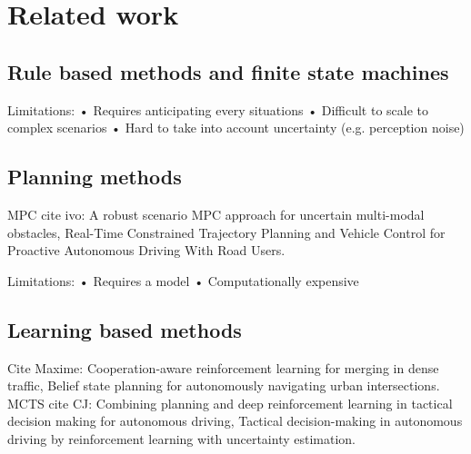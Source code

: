 \chapter{Related work}\label{ch:related_work}

\section{Rule based methods and finite state machines}
Limitations:
• Requires anticipating every situations
• Difficult to scale to complex scenarios
• Hard to take into account uncertainty (e.g. perception noise)

\section{Planning methods}

MPC cite ivo:
A robust scenario MPC approach for uncertain multi-modal obstacles,
Real-Time Constrained Trajectory Planning and Vehicle Control for Proactive Autonomous Driving With Road Users.

Limitations:
• Requires a model
• Computationally expensive

\section{Learning based methods}
Cite Maxime: 
Cooperation-aware reinforcement learning for merging in dense traffic, 
Belief state planning for autonomously navigating urban intersections.
MCTS cite CJ:
Combining planning and deep reinforcement learning in tactical decision making for autonomous driving,
Tactical decision-making in autonomous driving by reinforcement learning with uncertainty estimation.




